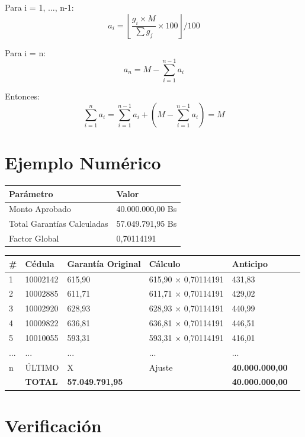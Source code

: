 Para i = 1, ..., n-1:
\[
a_i = \left\lfloor \frac{g_i \times M}{\sum g_j} \times 100 \right\rfloor / 100
\]

Para i = n:
\[
a_n = M - \sum_{i=1}^{n-1} a_i
\]

Entonces:
\[
\sum_{i=1}^{n} a_i = \sum_{i=1}^{n-1} a_i + \left( M - \sum_{i=1}^{n-1} a_i \right) = M
\]

\bigskip

\section{Ejemplo Numérico}

\begin{center}
\begin{tabular}{ll}
\toprule
\textbf{Parámetro} & \textbf{Valor} \\
\midrule
Monto Aprobado & 40.000.000,00 Bs \\
Total Garantías Calculadas & 57.049.791,95 Bs \\
Factor Global & 0,70114191 \\
\bottomrule
\end{tabular}
\end{center}

\bigskip

\begin{center}
\begin{tabular}{llllll}
\toprule
\textbf{\#} & \textbf{Cédula} & \textbf{Garantía Original} & \textbf{Cálculo} & \textbf{Anticipo} \\
\midrule
1 & 10002142 & 615,90 & 615,90 × 0,70114191 & 431,83 \\
2 & 10002885 & 611,71 & 611,71 × 0,70114191 & 429,02 \\
3 & 10002920 & 628,93 & 628,93 × 0,70114191 & 440,99 \\
4 & 10009822 & 636,81 & 636,81 × 0,70114191 & 446,51 \\
5 & 10010055 & 593,31 & 593,31 × 0,70114191 & 416,01 \\
... & ... & ... & ... & ... \\
n & ÚLTIMO & X & Ajuste & \textbf{40.000.000,00} \\
\midrule
  & \textbf{TOTAL} & \textbf{57.049.791,95} & & \textbf{40.000.000,00} \\
\bottomrule
\end{tabular}
\end{center}

\bigskip

\section{Verificación}

